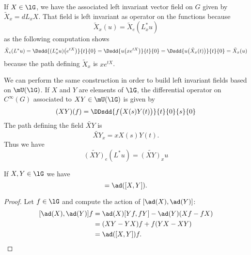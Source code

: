 If $X\in\lG$, we have the associated left invariant vector field on $G$ given by $\tilde X_x=dL_xX$. That field is left invariant as operator on the functions because
\begin{equation}
    \tilde X_x(u)=\tilde X_e(L^*_xu)
\end{equation}
as the following computation shows
\begin{equation}
        \tilde X_e(L^*u)=\Dsdd{ (L_x^*u)\big(  e^{tX} \big) }{t}{0}
        =\Dsdd{ u\big( x e^{tX} \big) }{t}{0}
        =\Dsdd{ u\big( \tilde X_x(t) \big) }{t}{0}
        =\tilde X_x(u)
\end{equation}
because the path defining $\tilde X_x$ is $x e^{tX}$.

We can perform the same construction in order to build left invariant fields based on $\mU(\lG)$. If $X$ and $Y$ are elements of $\lG$, the  differential operator on $ C^{\infty}(G)$ associated to $XY\in\mU(\lG)$ is given by
\begin{equation}
    (XY)(f)=\DDsdd{ f\big( X(s)Y(t) \big) }{t}{0}{s}{0}
\end{equation}
The path defining the field $\widetilde{XY}$ is
\begin{equation}
    \widetilde{XY}_x=xX(s)Y(t).
\end{equation}
Thus we have
\begin{equation}        \label{EqInvarUgField}
    \widetilde{(XY)}_e(L^*u)=\widetilde{(XY)}_xu
\end{equation}

\begin{lemma}       \label{LemAdesthioo}
    If \( X,Y\in\lG\) we have
    \begin{equation}
        [\ad(X),\ad(Y)]=\ad([X,Y]).
    \end{equation}
\end{lemma}

\begin{proof}
    Let \( f\in\lG\) and compute the action of \( [\ad(X),\ad(Y)]\):
    \begin{subequations}
        \begin{align}
            [\ad(X),\ad(Y)]f&=\ad(X)[Yf,fY]-\ad(Y)(Xf-fX)\\
            &=(XY-YX)f+f(YX-XY)\\
            &=\ad([X,Y])f.
        \end{align}
    \end{subequations}
\end{proof}

